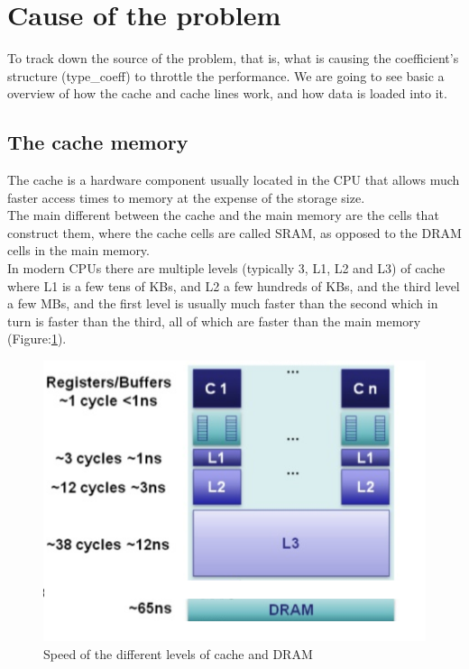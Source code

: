 \documentclass {article}
\begin{document}
\section{Cause of the problem}
To track down the source of the problem, that is, what is causing the
coefficient's structure (type\_coeff) to throttle the performance.
We are going to see basic a overview of how the cache and cache lines work, and
how data is loaded into it.

\subsection{The cache memory}
The cache is a hardware component usually located in the CPU that allows much
faster access times to memory at the expense of the storage size.\\

The main different between the cache and the main memory are the cells that
construct them, where the cache cells are called SRAM, as opposed to the DRAM
cells in the main memory.\\

In modern CPUs there are multiple levels (typically 3, L1, L2 and L3) of cache
where L1 is a few tens of KBs, and L2 a few hundreds of KBs, and the third level
a few MBs, and the first level is usually much faster than the second which in
turn is faster than the third, all of which are faster than the main
memory (Figure:\ref{fig:compram}).

\begin{figure}[H]
    \includegraphics[width=\linewidth]{plot/cacheperf.png}
    \caption{Speed of the different levels of cache and DRAM}
    \label{fig:compram}
\end{figure}
\end{document}
